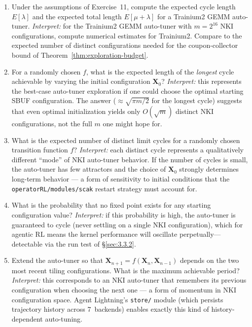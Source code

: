 \documentclass[12pt]{article}
\newcommand{\SBUF}{\textsc{SBUF}}                 %
\begin{document}
\begin{enumerate}
\item[\textbf{12.}] [$M31$] Under the assumptions of Exercise~11, compute the expected cycle length $E[\lambda]$ and the expected total length $E[\mu + \lambda]$ for a Trainium2 GEMM auto-tuner. \emph{Interpret:} for the Trainium2 GEMM auto-tuner with $m = 2^{16}$ NKI configurations, compute numerical estimates for Trainium2. Compare to the expected number of distinct configurations needed for the coupon-collector bound of Theorem~\ref{thm:exploration-budget}.

\item[\textbf{13.}] [$M42$] For a randomly chosen $f$, what is the expected length of the \emph{longest} cycle achievable by varying the initial configuration $\mathbf{X}_0$? \emph{Interpret:} this represents the best-case auto-tuner exploration if one could choose the optimal starting \SBUF{} configuration. The answer ($\approx \sqrt{\pi m / 2}$ for the longest cycle) suggests that even optimal initialization yields only $O(\sqrt{m})$ distinct NKI configurations, not the full $m$ one might hope for.

\item[\textbf{14.}] [$M38$] What is the expected number of distinct limit cycles for a randomly chosen transition function $f$? \emph{Interpret:} each distinct cycle represents a qualitatively different ``mode'' of NKI auto-tuner behavior. If the number of cycles is small, the auto-tuner has few attractors and the choice of $\mathbf{X}_0$ strongly determines long-term behavior --- a form of sensitivity to initial conditions that the \texttt{operatorRL/modules/scak} restart strategy must account for.

\item[\textbf{15.}] [$M15$] What is the probability that no fixed point exists for any starting configuration value? \emph{Interpret:} if this probability is high, the auto-tuner is guaranteed to cycle (never settling on a single NKI configuration), which for agentic RL means the kernel performance will oscillate perpetually---detectable via the run test of \S\ref{sec:3.3.2}.

\item[\textbf{16.}] [15] Extend the auto-tuner so that $\mathbf{X}_{n+1} = f(\mathbf{X}_n, \mathbf{X}_{n-1})$ depends on the two most recent tiling configurations. What is the maximum achievable period? \emph{Interpret:} this corresponds to an NKI auto-tuner that remembers its previous configuration when choosing the next one --- a form of momentum in NKI configuration space. Agent Lightning's \texttt{store/} module (which persists trajectory history across 7~backends) enables exactly this kind of history-dependent auto-tuning.


\end{enumerate}
\end{document}
